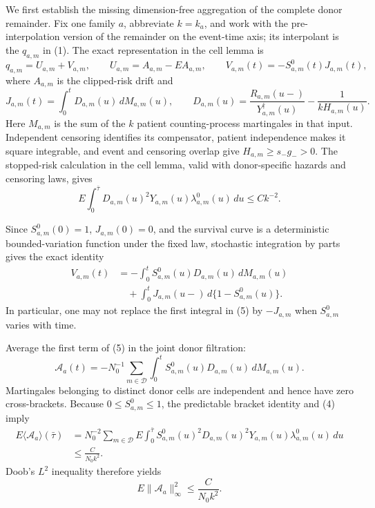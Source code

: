 We first establish the missing dimension-free aggregation of the complete
donor remainder.  Fix one family \(a\), abbreviate \(k=k_a\), and work with
the pre-interpolation version of the remainder on the event-time axis; its
interpolant is the \(q_{a,m}\) in (1).  The exact representation in the cell
lemma is
\[
 q_{a,m}=U_{a,m}+V_{a,m},
 \qquad
 U_{a,m}=A_{a,m}-EA_{a,m},
 \qquad
 V_{a,m}(t)=-S^0_{a,m}(t)J_{a,m}(t),                   \tag{2}
\]
where \(A_{a,m}\) is the clipped-risk drift and
\[
 J_{a,m}(t)=\int_0^tD_{a,m}(u)\,dM_{a,m}(u),
 \qquad
 D_{a,m}(u)=\frac{R_{a,m}(u-)}{Y_{a,m}^{\dagger}(u)}
             -\frac{1}{kH_{a,m}(u)}.                  \tag{3}
\]
Here \(M_{a,m}\) is the sum of the \(k\) patient counting-process
martingales in that input.  Independent censoring identifies its compensator,
patient independence makes it square integrable, and event and censoring
overlap give \(H_{a,m}\geq s_-g_->0\).  The stopped-risk calculation in
the cell lemma, valid with donor-specific hazards and censoring laws, gives
\[
 E\int_0^{\bar\tau}D_{a,m}(u)^2Y_{a,m}(u)
       \lambda^0_{a,m}(u)\,du\leq Ck^{-2}.             \tag{4}
\]

Since \(S^0_{a,m}(0)=1\), \(J_{a,m}(0)=0\), and the survival curve is a
deterministic bounded-variation function under the fixed law, stochastic
integration by parts gives the exact identity
\[
 \begin{split}
 V_{a,m}(t)
 &=-\int_0^tS^0_{a,m}(u)D_{a,m}(u)\,dM_{a,m}(u)\\
 &\quad+\int_0^tJ_{a,m}(u-)\,d\{1-S^0_{a,m}(u)\}.
 \end{split}                                           \tag{5}
\]
In particular, one may not replace the first integral in (5) by
\(-J_{a,m}\) when \(S^0_{a,m}\) varies with time.

Average the first term of (5) in the joint donor filtration:
\[
 \mathcal A_a(t)=-N_0^{-1}\sum_{m\in\mathcal D}
 \int_0^tS^0_{a,m}(u)D_{a,m}(u)\,dM_{a,m}(u).          \tag{6}
\]
Martingales belonging to distinct donor cells are independent and hence have
zero cross-brackets.  Because \(0\leq S^0_{a,m}\leq1\), the predictable
bracket identity and (4) imply
\[
 \begin{split}
 E\langle\mathcal A_a\rangle(\bar\tau)
 &=N_0^{-2}\sum_{m\in\mathcal D}E\int_0^{\bar\tau}
   S^0_{a,m}(u)^2D_{a,m}(u)^2Y_{a,m}(u)
   \lambda^0_{a,m}(u)\,du\\
 &\leq \frac{C}{N_0k^2}.
 \end{split}                                           \tag{7}
\]
Doob's \(L^2\) inequality therefore yields
\[
 E\|\mathcal A_a\|_\infty^2\leq\frac{C}{N_0k^2}.     \tag{8}
\]

